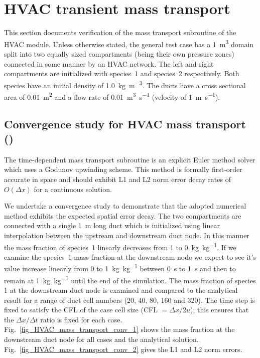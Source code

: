 \documentclass[11pt]{book}
\begin{document}
\section{HVAC transient mass transport}
This section documents verification of the mass transport subroutine of the HVAC module. Unless otherwise stated, the general test case has a \SI{1}{\meter\cubed} domain split into two equally sized compartments (being their own pressure zones) connected in some manner by an HVAC network. The left and right compartments are initialized with species~1 and species~2 respectively. Both species have an initial density of \SI[per-mode=symbol]{1.0}{\kilogram\per\meter\cubed}. The ducts have a cross sectional area of \SI{0.01}{m^2} and a flow rate of \SI[per-mode=symbol]{0.01}{\meter\cubed\per\second} (velocity of \SI[per-mode=symbol]{1}{\meter\per\second}).

\subsection{Convergence study for HVAC mass transport (\texorpdfstring{}{HVAC\_mass\_transport\_conv\_x})}
\label{HVAC_mass_transport_conv_0020}
\label{HVAC_mass_transport_conv_0040}
\label{HVAC_mass_transport_conv_0080}
\label{HVAC_mass_transport_conv_0160}
\label{HVAC_mass_transport_conv_0320}
The time-dependent mass transport subroutine is an explicit Euler method solver which uses a Godunov upwinding scheme. This method is formally first-order accurate in space and should exhibit L1 and L2 norm error decay rates of \(O(\Delta x)\) for a continuous solution.

We undertake a convergence study to demonstrate that the adopted numerical method exhibits the expected spatial error decay. The two compartments are connected with a single \SI{1}{\meter} long duct which is initialized using linear interpolation between the upstream and downstream duct node. In this manner the mass fraction of species~1 linearly decreases from \num{1} to \SI[per-mode=symbol]{0}{\kilogram\per\kilogram}. If we examine the species~1 mass fraction at the downstream node we expect to see it's value increase linearly from \num{0} to \SI[per-mode=symbol]{1}{\kilogram\per\kilogram} between \SI{0}{\second} to \SI{1}{\second} and then to remain at \SI[per-mode=symbol]{1}{\kilogram\per\kilogram} until the end of the simulation. The mass fraction of species 1 at the downstream duct node is examined and compared to the analytical result for a range of duct cell numbers (20, 40, 80, 160 and 320). The time step is fixed to satisfy the CFL of the case cell size (CFL \(= \Delta x/2u\)); this ensures that the \(\Delta x/\Delta t\) ratio is fixed for each case. Fig.~\ref{fig_HVAC_mass_transport_conv_1} shows the mass fraction at the downstream duct node for all cases and the analytical solution. Fig.~\ref{fig_HVAC_mass_transport_conv_2} gives the L1 and L2 norm errors.
\end{document}
